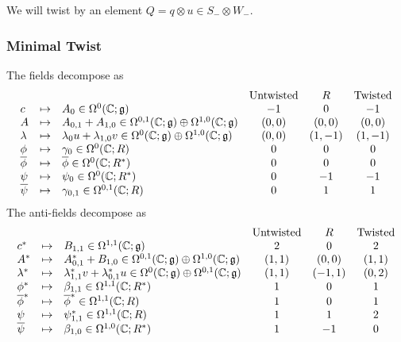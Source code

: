 \documentclass[10pt, oneside]{article}
\begin{document}
We will twist by an element $Q = q \otimes u \in S_- \otimes W_-$. 

\subsubsection{Minimal Twist} \label{sect:2d02minimaltwist}

The fields decompose as
\[
\begin{array} {lllcccccc}
& &  & {\rm Untwisted} & R & {\rm Twisted}  \\
c & \mapsto & A_{0} \in \Omega^0(\mathbb C ; \mathfrak g) & -1 & 0 & -1 \\
A & \mapsto & A_{0,1} + A_{1,0} \in \Omega^{0,1}(\mathbb C ; \mathfrak g) \oplus \Omega^{1,0}(\mathbb C ; \mathfrak g)  & (0,0) & (0,0) & (0,0) \\
\lambda & \mapsto & \lambda_{0} u + \lambda_{1,0} v \in \Omega^{0}(\mathbb C ; \mathfrak g) \oplus \Omega^{1,0}(\mathbb C ; \mathfrak g) & (0,0) & (1,-1) & (1,-1) \\
\phi & \mapsto &  \gamma_0 \in \Omega^0 (\mathbb C ; R) & 0 & 0 & 0 \\
\overline{\phi} & \mapsto & \overline{\phi} \in \Omega^{0}(\mathbb C ; R^*) & 0 & 0 & 0 \\
\psi & \mapsto &  \psi_0 \in \Omega^{0}(\mathbb C ; R^*) & 0 & -1 & -1 \\
\overline{\psi} & \mapsto & \gamma_{0,1} \in \Omega^{0,1}(\mathbb C ; R)  & 0 & 1 & 1 
\end{array}
\]
The anti-fields decompose as
\[
\begin{array} {lllcccccc}
& &  & {\rm Untwisted} & R & {\rm Twisted}  \\
c^* & \mapsto & B_{1,1} \in \Omega^{1,1} (\mathbb C ; \mathfrak g) & 2 & 0 & 2 \\
A^* & \mapsto &  A^*_{0,1} + B_{1,0} \in \Omega^{0,1}(\mathbb C ; \mathfrak g) \oplus \Omega^{1,0}(\mathbb C ; \mathfrak g)  & (1,1) & (0,0) & (1,1) \\
\lambda^* & \mapsto &  \lambda^*_{1,1} v + \lambda^*_{0,1} u \in \Omega^{0}(\mathbb C ; \mathfrak g) \oplus \Omega^{0,1}(\mathbb C ; \mathfrak g)  & (1,1) & (-1,1) & (0,2) \\
\phi^* & \mapsto &   \beta_{1,1} \in \Omega^{1,1} (\mathbb C ; R^*) & 1 & 0 & 1 \\
\overline{\phi}^* & \mapsto &\overline{\phi}^* \in \Omega^{1,1}(\mathbb C ; R)  & 1 & 0 & 1 \\
\psi & \mapsto &   \psi^*_{1,1} \in \Omega^{1,1}(\mathbb C ; R) & 1 & 1 & 2 \\
\overline{\psi} & \mapsto &  \beta_{1,0} \in \Omega^{1,0}(\mathbb C ; R^*)   & 1 & -1 & 0 
\end{array}
\]
\end{document}
